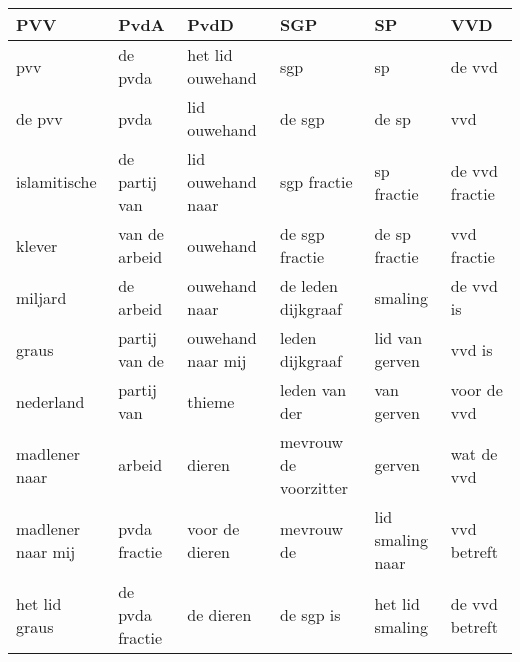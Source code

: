 \begin{tabular}{llllll}
\toprule
               PVV &             PvdA &               PvdD &                    SGP &                SP &             VVD \\
\midrule
               pvv &          de pvda &   het lid ouwehand &                    sgp &                sp &          de vvd \\
            de pvv &             pvda &       lid ouwehand &                 de sgp &             de sp &             vvd \\
      islamitische &    de partij van &  lid ouwehand naar &            sgp fractie &        sp fractie &  de vvd fractie \\
            klever &    van de arbeid &           ouwehand &         de sgp fractie &     de sp fractie &     vvd fractie \\
           miljard &        de arbeid &      ouwehand naar &     de leden dijkgraaf &           smaling &       de vvd is \\
             graus &    partij van de &  ouwehand naar mij &        leden dijkgraaf &    lid van gerven &          vvd is \\
         nederland &       partij van &             thieme &          leden van der &        van gerven &     voor de vvd \\
     madlener naar &           arbeid &             dieren &  mevrouw de voorzitter &            gerven &      wat de vvd \\
 madlener naar mij &     pvda fractie &     voor de dieren &             mevrouw de &  lid smaling naar &     vvd betreft \\
     het lid graus &  de pvda fractie &          de dieren &              de sgp is &   het lid smaling &  de vvd betreft \\
\bottomrule
\end{tabular}
